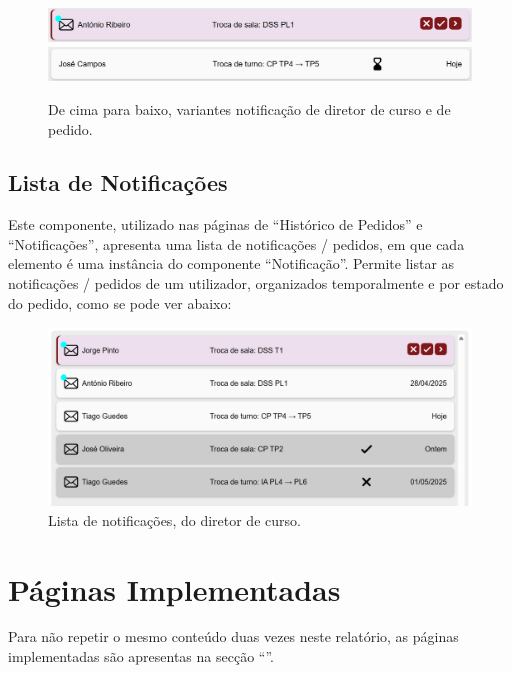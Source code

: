 \documentclass[12pt, a4paper]{article}
\begin{document}
\begin{figure}[H]
    \centering
    \includegraphics[width=\textwidth]{res/components/director-notification.png}
    \includegraphics[width=\textwidth]{res/components/student-request.png}
    \caption{De cima para baixo, variantes notificação de diretor de curso e de pedido.}
    \label{notification}
\end{figure}

\subsection{Lista de Notificações}

Este componente, utilizado nas páginas de ``Histórico de Pedidos'' e ``Notificações'', apresenta uma
lista de notificações / pedidos, em que cada elemento é uma instância do componente ``Notificação''.
Permite listar as notificações / pedidos de um utilizador, organizados temporalmente e por estado do
pedido, como se pode ver abaixo:

\begin{figure}[H]
    \centering
    \includegraphics[width=\textwidth]{res/components/director-notifications-list.png}
    \caption{Lista de notificações, do diretor de curso.}
    \label{notifications-list}
\end{figure}

\section{Páginas Implementadas}

Para não repetir o mesmo conteúdo duas vezes neste relatório, as páginas implementadas são
apresentas na secção ``''.
\end{document}
